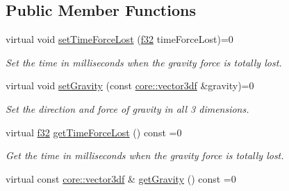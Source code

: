 \subsection*{Public Member Functions}
\begin{DoxyCompactItemize}
\item 
virtual void \hyperlink{classirr_1_1scene_1_1IParticleGravityAffector_a3910d872c740e678373cecbd5523ad38}{set\+Time\+Force\+Lost} (\hyperlink{namespaceirr_a0277be98d67dc26ff93b1a6a1d086b07}{f32} time\+Force\+Lost)=0
\begin{DoxyCompactList}\small\item\em Set the time in milliseconds when the gravity force is totally lost. \end{DoxyCompactList}\item 
\mbox{\label{classirr_1_1scene_1_1IParticleGravityAffector_ad5c31751978d5b0415a36353e4279e77}} 
virtual void \hyperlink{classirr_1_1scene_1_1IParticleGravityAffector_ad5c31751978d5b0415a36353e4279e77}{set\+Gravity} (const \hyperlink{namespaceirr_1_1core_a06f169d08b5c429f5575acb7edbad811}{core\+::vector3df} \&gravity)=0
\begin{DoxyCompactList}\small\item\em Set the direction and force of gravity in all 3 dimensions. \end{DoxyCompactList}\item 
\mbox{\label{classirr_1_1scene_1_1IParticleGravityAffector_a957d0e0d273e4c2fb4b2cc6017a67038}} 
virtual \hyperlink{namespaceirr_a0277be98d67dc26ff93b1a6a1d086b07}{f32} \hyperlink{classirr_1_1scene_1_1IParticleGravityAffector_a957d0e0d273e4c2fb4b2cc6017a67038}{get\+Time\+Force\+Lost} () const =0
\begin{DoxyCompactList}\small\item\em Get the time in milliseconds when the gravity force is totally lost. \end{DoxyCompactList}\item 
\mbox{\label{classirr_1_1scene_1_1IParticleGravityAffector_ac6368c49867f62a4e873dfd6142abec9}} 
virtual const \hyperlink{namespaceirr_1_1core_a06f169d08b5c429f5575acb7edbad811}{core\+::vector3df} \& \hyperlink{classirr_1_1scene_1_1IParticleGravityAffector_ac6368c49867f62a4e873dfd6142abec9}{get\+Gravity} () const =0

\end{DoxyCompactItemize}
